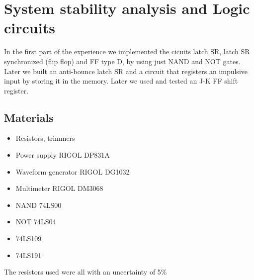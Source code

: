 \chapter{System stability analysis and Logic circuits}
In the first  part of the experience we implemented the cicuits latch SR, latch SR synchronized (flip flop) and FF type D, by using just NAND and NOT gates. Later we built an anti-bounce latch SR and a circuit that registers an impulsive input by storing it in the memory. Later we used and tested an J-K FF shift register.

\section{Materials}
\begin{itemize}
\item Resistors, trimmers
\item Power supply RIGOL DP831A
\item Waveform generator RIGOL DG1032
\item Multimeter RIGOL DM3068
\item NAND 74LS00
\item NOT 74LS04
\item 74LS109
\item 74LS191
\end{itemize}
The resistors used were all with an uncertainty of 5\%

